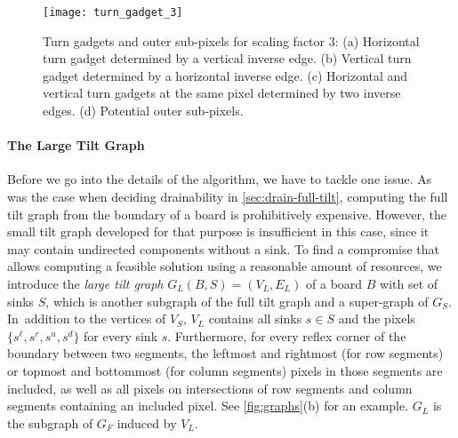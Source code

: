 \documentclass[a4paper,UKenglish,cleveref,thm-restate]{lipics-v2021}
\begin{document}
\begin{figure}[htb]
\centering
\texttt{[image: turn\_gadget\_3]}\caption{Turn gadgets and outer sub-pixels for scaling factor 3: (a) Horizontal
turn gadget determined by a vertical inverse edge. (b) Vertical turn gadget
determined by a horizontal inverse edge. (c) Horizontal and vertical turn
gadgets at the same pixel determined by two inverse edges. (d) Potential outer
sub-pixels.}\label{fig:turn_gadget_3}
\end{figure}

\paragraph*{The Large Tilt Graph}

Before we go into the details of the algorithm, we have to tackle one issue. As
was the case when deciding drainability in \cref{sec:drain-full-tilt}, computing
the full tilt graph from the boundary of a board is prohibitively expensive.
However, the small tilt graph developed for that purpose is insufficient in this
case, since it may contain undirected components without a sink.
To find a compromise that allows computing a feasible solution using a
reasonable amount of resources, we
introduce the \emph{large tilt graph} $G_L(B,S)=(V_L,E_L)$ of a board $B$ with
set of sinks $S$, which is another subgraph of the full tilt graph and a
super-graph of $G_S$. In~addition to the vertices of $V_S$, $V_L$ contains all
sinks \(s \in S\) and the pixels \(\{s^{\ell}, s^r, s^u, s^d\}\) for every sink
$s$.  Furthermore, for every reflex corner of the boundary between two segments,
the leftmost and rightmost (for row segments) or topmost and bottommost (for
column segments) pixels in those segments are included, as well as all pixels on
intersections of row segments and column segments containing an included
pixel. See \cref{fig:graphs}(b) for an example. $G_L$ is the subgraph of $G_F$
induced by $V_L$.
\end{document}
